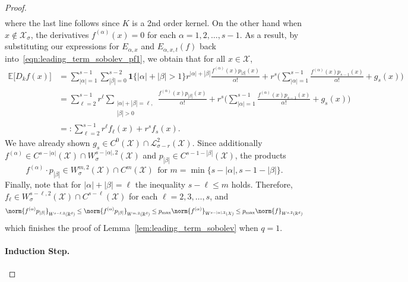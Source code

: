 \documentclass{article}
\newcommand{\Reals}{\mathbb{R}}
\newcommand{\abs}[1]{\left \lvert #1 \right \rvert}
\newcommand{\1}{\mathbf{1}}
\newcommand{\Rd}{\Reals^d}
\newcommand{\Xset}{\mathcal{X}}
\newcommand{\Leb}{\mathcal{L}}
\newcommand{\Ebb}{\mathbb{E}}
\theoremstyle{alden}
\theoremstyle{aldenthm}
\theoremstyle{definition}
\theoremstyle{remark}
\begin{document}
\begin{proof}
\begin{align*}
	\end{align*}
	where the last line follows since $K$ is a 2nd order kernel. On the other hand when $x \not\in \Xset_{\sigma}$, the derivatives $f^{(\alpha)}(x) = 0$ for each $\alpha = 1,2,\ldots,s-1$. 
	As a result, by substituting our expressions for $E_{\alpha,x}$ and $E_{\alpha,x,t}(f)$ back into~\eqref{eqn:leading_term_sobolev_pf1}, we obtain that for all $x \in \Xset$,
	\begin{align*}
	\Ebb\bigl[D_kf(x)\big] & = \sum_{\abs{\alpha} = 1}^{s - 1} \sum_{\abs{\beta} = 0}^{s-2} \1\{\abs{\alpha} + \abs{\beta} > 1\} r^{\abs{\alpha} + \abs{\beta}} \frac{f^{(\alpha)}(x)p_{\abs{\beta}}(x)}{\alpha!} + r^s \biggl(\sum_{\abs{\alpha} = 1}^{s - 1} \frac{f^{(\alpha)}(x)p_{s - 1}(x)}{\alpha!} + g_s(x)\biggr) \\
	& = \sum_{\ell = 2}^{s - 1} r^{\ell} \sum_{ \substack{\abs{\alpha} + \abs{\beta} = \ell, \\ \abs{\beta} > 0} }   \frac{f^{(\alpha)}(x)p_{\abs{\beta}}(x)}{\alpha!} + r^s \biggl(\sum_{\abs{\alpha} = 1}^{s - 1} \frac{f^{(\alpha)}(x)p_{s - 1}(x)}{\alpha!} + g_s(x)\biggr) \\
	& =: \sum_{\ell = 2}^{s - 1} r^{\ell} f_{\ell}(x) + r^s f_s(x).
	\end{align*}
	We have already shown $g_s \in C^{0}(\Xset) \cap \Leb_{\sigma - r}^2(\Xset)$. Since additionally $f^{(\alpha)} \in C^{s - \abs{\alpha}}(\Xset) \cap W_{\sigma}^{s - \abs{\alpha},2}(\Xset)$ and $p_{\abs{\beta}} \in C^{s - 1 - \abs{\beta}}(\Xset)$, the products 
	\begin{equation*}
	f^{(\alpha)} \cdot p_{\abs{\beta}} \in W_{\sigma}^{m,2}(\Xset) \cap C^{m}(\Xset) ~~\textrm{for $m = \min\{s - \abs{\alpha}, s - 1 - \abs{\beta}\}$.}
	\end{equation*}
	Finally, note that for $\abs{\alpha} + \abs{\beta} = \ell$ the inequality $s - \ell \leq m$ holds. Therefore, $f_{\ell} \in W_{\sigma}^{s - \ell,2}(\Xset) \cap C^{s - \ell}(\Xset)$ for each $\ell = 2,3,\ldots,s$, and 
	\begin{equation*}
	\norm{f^{(\alpha)}p_{\abs{\beta}}}_{W^{s - \ell,2}(\Rd)} \leq \norm{f^{(\alpha)}p_{\abs{\beta}}}_{W^{m,2}(\Rd)} \leq p_{\max} \norm{f^{(\alpha)}}_{W^{s - \abs{\alpha},2}(\Xset)} \leq p_{\max} \norm{f}_{W^{s,2}(\Rd)}
	\end{equation*} 
	which finishes the proof of Lemma~\ref{lem:leading_term_sobolev} when $q = 1$.
	
	\paragraph{Induction Step.}
	

\end{proof}
\end{document}
